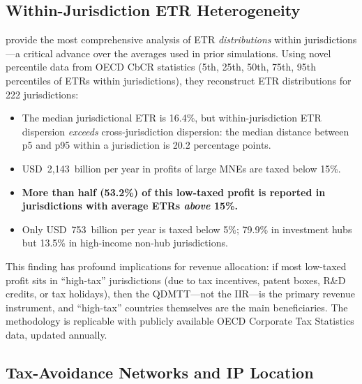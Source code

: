 \documentclass[11pt,a4paper]{article}
\begin{document}
\subsection{Within-Jurisdiction ETR Heterogeneity}
\label{subsec:hugger}

\citet{hugger2025} provide the most comprehensive analysis of ETR \emph{distributions} within jurisdictions---a critical advance over the averages used in prior simulations. Using novel percentile data from OECD CbCR statistics (5th, 25th, 50th, 75th, 95th percentiles of ETRs within jurisdictions), they reconstruct ETR distributions for 222 jurisdictions:
\begin{itemize}[nosep]
    \item The median jurisdictional ETR is 16.4\%, but within-jurisdiction ETR dispersion \emph{exceeds} cross-jurisdiction dispersion: the median distance between p5 and p95 within a jurisdiction is 20.2 percentage points.
    \item USD~2,143~billion per year in profits of large MNEs are taxed below 15\%.
    \item \textbf{More than half (53.2\%) of this low-taxed profit is reported in jurisdictions with average ETRs \emph{above} 15\%.}
    \item Only USD~753~billion per year is taxed below 5\%; 79.9\% in investment hubs but 13.5\% in high-income non-hub jurisdictions.
\end{itemize}
This finding has profound implications for revenue allocation: if most low-taxed profit sits in ``high-tax'' jurisdictions (due to tax incentives, patent boxes, R\&D credits, or tax holidays), then the QDMTT---not the IIR---is the primary revenue instrument, and ``high-tax'' countries themselves are the main beneficiaries. The methodology is replicable with publicly available OECD Corporate Tax Statistics data, updated annually.

\subsection{Tax-Avoidance Networks and IP Location}
\label{subsec:bilicka}
\end{document}
